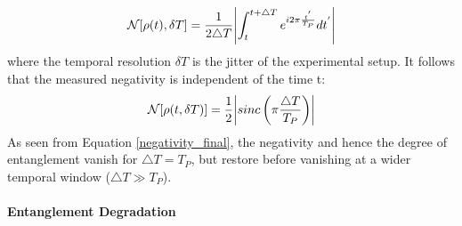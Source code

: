  \begin{equation}
		\mathcal{N}[\rho(t),\delta T] = \frac{1}{2\triangle T} \abs{\int_t^{t+\triangle T}e^{i2\pi \frac{t^{'}}{T_P}}  dt^{'}}
\end{equation}
where the temporal resolution $\delta T$ is the jitter of the experimental setup. It follows that the measured negativity is independent of the time t:
 \begin{equation}\label{negativity_final}
		\mathcal{N}[\rho(t,\delta T)] = \frac{1}{2} \abs{ sinc \left( \pi \frac{\triangle T}{T_P} \right)}
\end{equation}
As seen from Equation \ref{negativity_final}, the negativity and hence the degree of entanglement vanish for $\triangle T = T_P$, but restore before vanishing at a wider temporal window ($\triangle T \gg T_P$).
 \paragraph{Entanglement Degradation}
